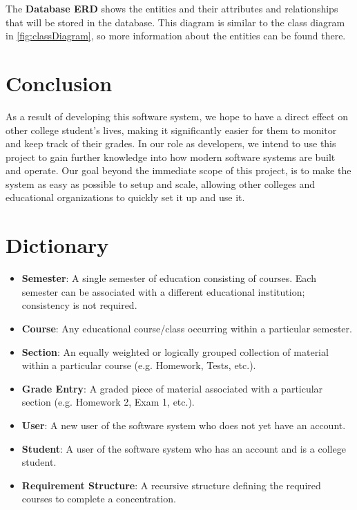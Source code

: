 \documentclass[12pt]{article}
\newcommand{\dictitem}[1]{\item \textbf{#1}:}
\newenvironment{dict}
{
    \begin{itemize}
}
{
    \end{itemize}
}
\begin{document}
\clearpage

The \textbf{Database ERD} shows the entities and their attributes and relationships that will be
stored in the database. This diagram is similar to the class diagram in \autoref{fig:classDiagram},
so more information about the entities can be found there.

\clearpage


\section{Conclusion}
As a result of developing this software system, we hope to have a direct effect on other college
student's lives, making it significantly easier for them to monitor and keep track of their grades.
In our role as developers, we intend to use this project to gain further knowledge into how modern
software systems are built and operate. Our goal beyond the immediate scope of this project, is to
make the system as easy as possible to setup and scale, allowing other colleges and educational
organizations to quickly set it up and use it.

\section{Dictionary}
\begin{dict}
    \dictitem{Semester} A single semester of education consisting of courses. Each semester can
    be associated with a different educational institution; consistency is not required.
    \dictitem{Course} Any educational course/class occurring within a particular semester.
    \dictitem{Section} An equally weighted or logically grouped collection of material within a
    particular course (e.g. Homework, Tests, etc.).
    \dictitem{Grade Entry} A graded piece of material associated with a particular section 
    (e.g. Homework 2, Exam 1, etc.).
    \dictitem{User} A new user of the software system who does not yet have an account.
    \dictitem{Student} A user of the software system who has an account and is a college student.
    \dictitem{Requirement Structure} A recursive structure defining the required courses to complete
    a concentration.
\end{dict}
\end{document}

